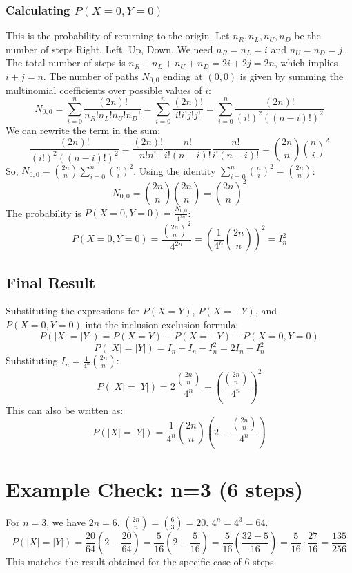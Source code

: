 \documentclass{article}
\begin{document}
\subsubsection{Calculating $P(X=0, Y=0)$}
This is the probability of returning to the origin. Let $n_R, n_L, n_U, n_D$ be the number of steps Right, Left, Up, Down. We need $n_R = n_L = i$ and $n_U = n_D = j$. The total number of steps is $n_R+n_L+n_U+n_D = 2i + 2j = 2n$, which implies $i+j=n$.
The number of paths $N_{0,0}$ ending at $(0,0)$ is given by summing the multinomial coefficients over possible values of $i$:
\[
N_{0,0} = \sum_{i=0}^{n} \frac{(2n)!}{n_R! n_L! n_U! n_D!} = \sum_{i=0}^{n} \frac{(2n)!}{i! i! j! j!} = \sum_{i=0}^{n} \frac{(2n)!}{(i!)^2 ((n-i)!)^2}
\]
We can rewrite the term in the sum:
\[
\frac{(2n)!}{(i!)^2 ((n-i)!)^2} = \frac{(2n)!}{n!n!} \frac{n!}{i!(n-i)!} \frac{n!}{i!(n-i)!} = \binom{2n}{n} \binom{n}{i}^2
\]
So, $N_{0,0} = \binom{2n}{n} \sum_{i=0}^{n} \binom{n}{i}^2$. Using the identity $\sum_{i=0}^{n} \binom{n}{i}^2 = \binom{2n}{n}$:
\[
N_{0,0} = \binom{2n}{n} \binom{2n}{n} = \binom{2n}{n}^2
\]
The probability is $P(X=0, Y=0) = \frac{N_{0,0}}{4^{2n}}$:
\[
P(X=0, Y=0) = \frac{\binom{2n}{n}^2}{4^{2n}} = \left( \frac{1}{4^n} \binom{2n}{n} \right)^2 = I_n^2
\]

\subsection{Final Result}
Substituting the expressions for $P(X=Y)$, $P(X=-Y)$, and $P(X=0, Y=0)$ into the inclusion-exclusion formula:
\[
P(|X|=|Y|) = P(X=Y) + P(X=-Y) - P(X=0, Y=0)
\]
\[
P(|X|=|Y|) = I_n + I_n - I_n^2 = 2I_n - I_n^2
\]
Substituting $I_n = \frac{1}{4^n} \binom{2n}{n}$:
\[
P(|X|=|Y|) = 2 \frac{\binom{2n}{n}}{4^n} - \left( \frac{\binom{2n}{n}}{4^n} \right)^2
\]
This can also be written as:
\[
P(|X|=|Y|) = \frac{1}{4^n} \binom{2n}{n} \left( 2 - \frac{\binom{2n}{n}}{4^n} \right)
\]

\section*{Example Check: n=3 (6 steps)}
For $n=3$, we have $2n=6$. $\binom{2n}{n} = \binom{6}{3} = 20$. $4^n = 4^3 = 64$.
\[
P(|X|=|Y|) = \frac{20}{64} \left( 2 - \frac{20}{64} \right) = \frac{5}{16} \left( 2 - \frac{5}{16} \right) = \frac{5}{16} \left( \frac{32-5}{16} \right) = \frac{5}{16} \cdot \frac{27}{16} = \frac{135}{256}
\]
This matches the result obtained for the specific case of 6 steps.
\end{document}
